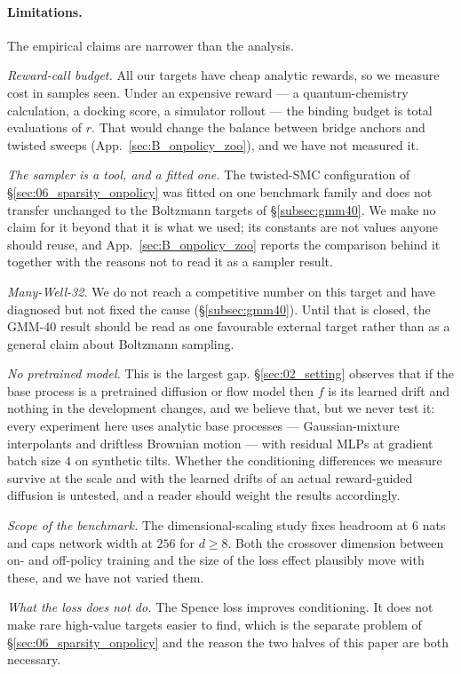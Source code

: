 \paragraph{Limitations.}
The empirical claims are narrower than the analysis.

\emph{Reward-call budget.} All our targets have cheap analytic rewards, so we
measure cost in samples seen. Under an expensive reward --- a quantum-chemistry
calculation, a docking score, a simulator rollout --- the binding budget is
total evaluations of $r$. That would change the balance between bridge anchors
and twisted sweeps (App.~\ref{sec:B_onpolicy_zoo}), and we have not measured
it.

\emph{The sampler is a tool, and a fitted one.} The twisted-SMC configuration
of \S\ref{sec:06_sparsity_onpolicy} was fitted on one benchmark family and does
not transfer unchanged to the Boltzmann targets of \S\ref{subsec:gmm40}. We
make no claim for it beyond that it is what we used; its constants are not
values anyone should reuse, and App.~\ref{sec:B_onpolicy_zoo} reports the
comparison behind it together with the reasons not to read it as a sampler
result.

\emph{Many-Well-32.} We do not reach a competitive number on this target and
have diagnosed but not fixed the cause (\S\ref{subsec:gmm40}). Until that is
closed, the GMM-40 result should be read as one favourable external
target rather than as a general claim about Boltzmann sampling.

\emph{No pretrained model.} This is the largest gap. \S\ref{sec:02_setting}
observes that if the base process is a pretrained diffusion or flow model then
$f$ is its learned drift and nothing in the development changes, and we believe
that, but we never test it: every experiment here uses analytic base processes
--- Gaussian-mixture interpolants and driftless Brownian motion --- with
residual MLPs at gradient batch size $4$ on synthetic tilts. Whether the
conditioning differences we measure survive at the scale and with the learned
drifts of an actual reward-guided diffusion is untested, and a reader should
weight the results accordingly.

\emph{Scope of the benchmark.} The dimensional-scaling study fixes headroom at
$6$ nats and caps network width at $256$ for $d\ge8$. Both the crossover
dimension between on- and off-policy training and the size of the loss effect
plausibly move with these, and we have not varied them.

\emph{What the loss does not do.} The Spence loss improves conditioning. It
does not make rare high-value targets easier to find, which is the separate
problem of \S\ref{sec:06_sparsity_onpolicy} and the reason the two halves of
this paper are both necessary.

